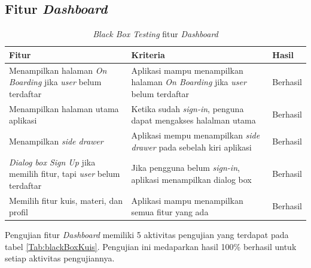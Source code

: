 \subsection{Fitur \textit{Dashboard}}
\begin{table}[H]
	\centering
	\caption{\textit{Black Box Testing} fitur \textit{Dashboard}}
	\label{Tab:blackBoxDash}
	\begin{tabular}{|p{}|p{}|p{}|}
		\hline
		 \centering\textbf{Fitur} & \multicolumn{1}{m{0.45\textwidth}|}{\centering \textbf{Kriteria}}&  \multicolumn{1}{m{0.1\textwidth}|}{\centering \textbf{Hasil}}\\
		\hline
		Menampilkan halaman \textit{On Boarding} jika \textit{user} belum terdaftar 
		& Aplikasi mampu menampilkan halaman \textit{On Boarding} jika \textit{user} belum terdaftar  
		& Berhasil\\
		\hline
		Menampilkan halaman utama aplikasi
		& Ketika sudah \textit{sign-in}, penguna dapat mengakses halalman utama 
		& Berhasil\\
		\hline
		Menampilkan \textit{side drawer}
		& Aplikasi mempu menampilkan \textit{side drawer} pada sebelah kiri aplikasi
		& Berhasil\\
		\hline
		\textit{Dialog box Sign Up} jika memilih fitur, tapi \textit{user} belum terdaftar
		& Jika pengguna belum \textit{sign-in}, aplikasi menampilkan dialog box 
		& Berhasil\\
		\hline
		Memilih fitur kuis, materi, dan profil
		& Aplikasi mampu menampilkan semua fitur yang ada
		& Berhasil\\
		\hline
	\end{tabular}
\end{table}
Pengujian fitur \textit{Dashboard} memiliki 5 aktivitas pengujian yang terdapat pada tabel \ref*{Tab:blackBoxKuis}.
Pengujian ini medaparkan hasil 100\% berhasil untuk setiap aktivitas pengujiannya.

